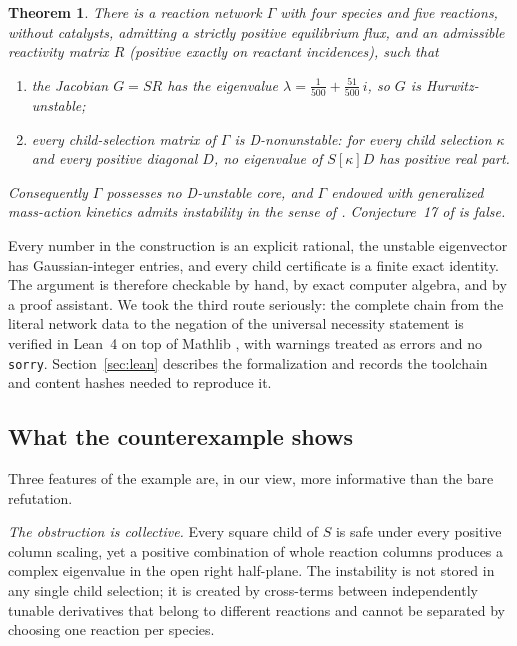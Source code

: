 \documentclass[11pt,a4paper]{article}
\newtheorem{theorem}{Theorem}[section]
\theoremstyle{definition}
\theoremstyle{remark}
\newcommand{\lean}[1]{\texttt{#1}}
\begin{document}
\begin{theorem}\label{thm:main}
There is a reaction network $\Gamma$ with four species and five reactions, without catalysts, admitting a strictly positive equilibrium flux, and an admissible reactivity matrix $R$ (positive exactly on reactant incidences), such that
\begin{enumerate}[label=(\roman*)]
\item the Jacobian $G=SR$ has the eigenvalue $\lambda=\tfrac1{500}+\tfrac{51}{500}\,i$, so $G$ is Hurwitz-unstable;
\item every child-selection matrix of $\Gamma$ is D-nonunstable: for every child selection $\kappa$ and every positive diagonal $D$, no eigenvalue of $S[\kappa]D$ has positive real part.
\end{enumerate}
Consequently $\Gamma$ possesses no D-unstable core, and $\Gamma$ endowed with generalized mass-action kinetics admits instability in the sense of \cite[Def.~2]{VassenaStadler2024}. Conjecture~17 of \cite{VassenaStadler2024} is false.
\end{theorem}

Every number in the construction is an explicit rational, the unstable eigenvector has Gaussian-integer entries, and every child certificate is a finite exact identity. The argument is therefore checkable by hand, by exact computer algebra, and by a proof assistant. We took the third route seriously: the complete chain from the literal network data to the negation of the universal necessity statement is verified in Lean~4 \cite{Lean4} on top of Mathlib \cite{Mathlib}, with warnings treated as errors and no \lean{sorry}. Section~\ref{sec:lean} describes the formalization and records the toolchain and content hashes needed to reproduce it.

\subsection*{What the counterexample shows}

Three features of the example are, in our view, more informative than the bare refutation.

\emph{The obstruction is collective.} Every square child of $S$ is safe under every positive column scaling, yet a positive combination of whole reaction columns produces a complex eigenvalue in the open right half-plane. The instability is not stored in any single child selection; it is created by cross-terms between independently tunable derivatives that belong to different reactions and cannot be separated by choosing one reaction per species.
\end{document}
